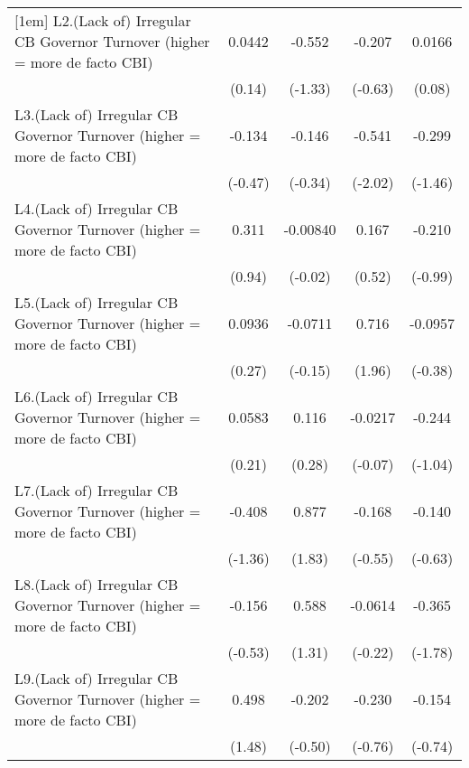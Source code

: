 {\begin{longtable}{l*{4}{c}}
[1em]
L2.(Lack of) Irregular CB Governor Turnover (higher = more de facto CBI)&   0.0442         &   -0.552         &   -0.207         &   0.0166         \\
                &   (0.14)         &  (-1.33)         &  (-0.63)         &   (0.08)         \\
[1em]
L3.(Lack of) Irregular CB Governor Turnover (higher = more de facto CBI)&   -0.134         &   -0.146         &   -0.541\sym{*}  &   -0.299         \\
                &  (-0.47)         &  (-0.34)         &  (-2.02)         &  (-1.46)         \\
[1em]
L4.(Lack of) Irregular CB Governor Turnover (higher = more de facto CBI)&    0.311         & -0.00840         &    0.167         &   -0.210         \\
                &   (0.94)         &  (-0.02)         &   (0.52)         &  (-0.99)         \\
[1em]
L5.(Lack of) Irregular CB Governor Turnover (higher = more de facto CBI)&   0.0936         &  -0.0711         &    0.716         &  -0.0957         \\
                &   (0.27)         &  (-0.15)         &   (1.96)         &  (-0.38)         \\
[1em]
L6.(Lack of) Irregular CB Governor Turnover (higher = more de facto CBI)&   0.0583         &    0.116         &  -0.0217         &   -0.244         \\
                &   (0.21)         &   (0.28)         &  (-0.07)         &  (-1.04)         \\
[1em]
L7.(Lack of) Irregular CB Governor Turnover (higher = more de facto CBI)&   -0.408         &    0.877         &   -0.168         &   -0.140         \\
                &  (-1.36)         &   (1.83)         &  (-0.55)         &  (-0.63)         \\
[1em]
L8.(Lack of) Irregular CB Governor Turnover (higher = more de facto CBI)&   -0.156         &    0.588         &  -0.0614         &   -0.365         \\
                &  (-0.53)         &   (1.31)         &  (-0.22)         &  (-1.78)         \\
[1em]
L9.(Lack of) Irregular CB Governor Turnover (higher = more de facto CBI)&    0.498         &   -0.202         &   -0.230         &   -0.154         \\
                &   (1.48)         &  (-0.50)         &  (-0.76)         &  (-0.74)         \\

\end{longtable}}
